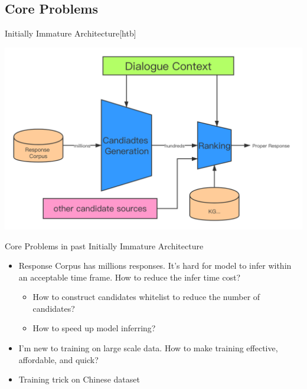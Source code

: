 \documentclass{beamer}
\begin{document}
\subsection{Core Problems}
\begin{frame}{Initially Immature Architecture}[htb]
     \begin{center}
        \includegraphics[width=1\linewidth]{arch.png}
    \end{center}
\end{frame}

\begin{frame} {Core Problems in past Initially Immature Architecture}

        \begin{itemize}
            \item Response Corpus has millions responses. It's hard for model to infer within an acceptable time frame. How to reduce the infer time cost?
            \begin{itemize}
                \item How to construct candidates whitelist to reduce the number of candidates?
                \item How to speed up model inferring?
            \end{itemize}
            \item I'm new to training on large scale data. How to make training effective, affordable, and quick?
            \item Training trick on Chinese dataset
        \end{itemize}

\end{frame}

\end{document}
